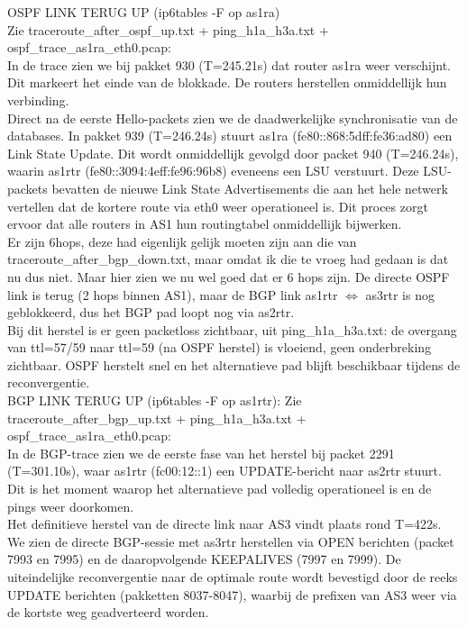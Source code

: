 OSPF LINK TERUG UP (ip6tables -F op as1ra)\\
Zie traceroute\_after\_ospf\_up.txt + ping\_h1a\_h3a.txt + ospf\_trace\_as1ra\_eth0.pcap:\\

In de trace zien we bij pakket 930 (T=245.21s) dat router as1ra weer verschijnt. Dit markeert het einde van de blokkade. De routers herstellen onmiddellijk hun verbinding.\\

Direct na de eerste Hello-packets zien we de daadwerkelijke synchronisatie van de databases. In pakket 939 (T=246.24s) stuurt as1ra (fe80::868:5dff:fe36:ad80) een Link State Update. Dit wordt onmiddellijk gevolgd door packet 940 (T=246.24s), waarin as1rtr (fe80::3094:4eff:fe96:96b8) eveneens een LSU verstuurt. Deze LSU-packets bevatten de nieuwe Link State Advertisements die aan het hele netwerk vertellen dat de kortere route via eth0 weer operationeel is. Dit proces zorgt ervoor dat alle routers in AS1 hun routingtabel onmiddellijk bijwerken.\\

Er zijn 6hops, deze had eigenlijk gelijk moeten zijn aan die van traceroute\_after\_bgp\_down.txt, maar omdat ik die te vroeg had gedaan is dat nu dus niet. Maar hier zien we nu wel goed dat er 6 hops zijn. De directe OSPF link is terug (2 hops binnen AS1), maar de BGP link as1rtr $\Leftrightarrow$ as3rtr
is nog geblokkeerd, dus het BGP pad loopt nog via as2rtr.\\

Bij dit herstel is er geen packetloss zichtbaar, uit ping\_h1a\_h3a.txt: de overgang van ttl=57/59 naar ttl=59 (na OSPF herstel) is vloeiend, geen onderbreking zichtbaar. OSPF herstelt snel en het alternatieve pad blijft beschikbaar tijdens de reconvergentie.\\

BGP LINK TERUG UP (ip6tables -F op as1rtr):
Zie traceroute\_after\_bgp\_up.txt + ping\_h1a\_h3a.txt + ospf\_trace\_as1ra\_eth0.pcap:\\

In de BGP-trace zien we de eerste fase van het herstel bij packet 2291 (T=301.10s), waar as1rtr (fc00:12::1) een UPDATE-bericht naar as2rtr stuurt. Dit is het moment waarop het alternatieve pad volledig operationeel is en de pings weer doorkomen.\\

Het definitieve herstel van de directe link naar AS3 vindt plaats rond T=422s. We zien de directe BGP-sessie met as3rtr herstellen via OPEN berichten (packet 7993 en 7995) en de daaropvolgende KEEPALIVES (7997 en 7999). De uiteindelijke reconvergentie naar de optimale route wordt bevestigd door de reeks UPDATE berichten (pakketten 8037-8047), waarbij de prefixen van AS3 weer via de kortste weg geadverteerd worden.\

